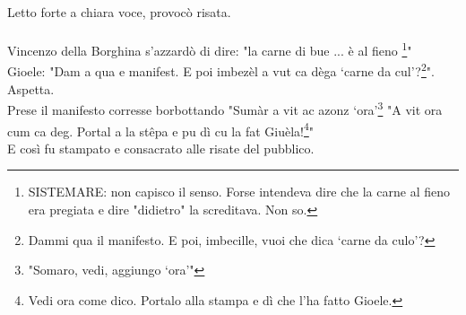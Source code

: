 \documentclass[10pt]{memoir} %
\begin{document}
 \normalsize \normalfont 

\noindent Letto forte a chiara voce, provocò risata.\\\\
 Vincenzo della Borghina s'azzardò di dire: "la carne di bue ... è al fieno \footnote{SISTEMARE: non capisco il senso. Forse intendeva dire che la carne al fieno era pregiata e dire "didietro" la screditava. Non so.}"\\
Gioele: "Dam a qua e manifest. E poi imbezèl a vut ca dèga ‘carne da cul'?\footnote{Dammi qua il manifesto. E poi, imbecille, vuoi che dica ‘carne da culo'?}". \\Aspetta.\\Prese il manifesto corresse borbottando "Sumàr a vit ac azonz ‘ora'\footnote{"Somaro, vedi, aggiungo ‘ora'"}
\newpage
{} \normalsize \normalfont
"A vit ora cum ca deg. Portal a la stêpa e pu dì cu la fat Giuèla!\footnote{Vedi ora come dico. Portalo alla stampa e dì che l'ha fatto Gioele.}"\\
E così fu stampato e consacrato alle risate del pubblico.
\end{document}
